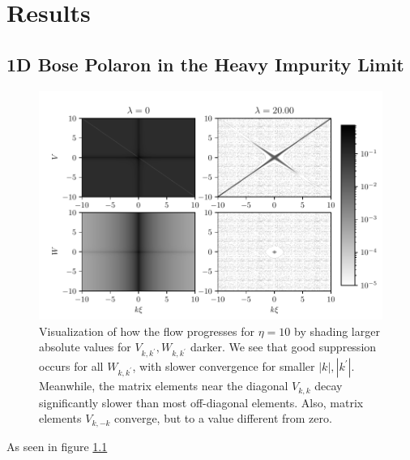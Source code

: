 \chapter{Results}\label{Results}
\section{1D Bose Polaron in the Heavy Impurity Limit}
\begin{figure}[H]
    \centering
    \includegraphics{figures/plots/PDF/FlowIllustration.pdf}
    \caption{Visualization of how the flow progresses for $\eta=10$ by shading larger absolute values for $V_{k,k^\prime},W_{k,k^\prime}$ darker. We see that good suppression occurs for all $W_{k,k^\prime}$, with slower convergence for smaller $|k|,|k^\prime|$.  Meanwhile, the matrix elements near the diagonal $V_{k,k}$ decay significantly slower than most off-diagonal elements. Also, matrix elements $V_{k,-k}$ converge, but to a value different from zero.}
    \label{FlowIllustration}
\end{figure}
As seen in figure \ref{FlowIllustration}